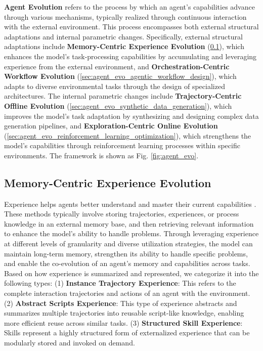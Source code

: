 \textbf{Agent Evolution} refers to the process by which an agent’s capabilities advance through various mechanisms, typically realized through continuous interaction with the external environment. This process encompasses both external structural adaptations and internal parametric changes. Specifically, external structural adaptations include \textbf{Memory-Centric Experience Evolution} (\cref{sec:agent_evo_experience_utilization}), which enhances the model's task-processing capabilities by accumulating and leveraging experience from the external environment, and \textbf{Orchestration-Centric Workflow Evolution} (\cref{sec:agent_evo_agentic_workflow_design}), which adapts to diverse environmental tasks through the design of specialized architectures. The internal parametric changes include \textbf{Trajectory-Centric Offline Evolution} (\cref{sec:agent_evo_synthetic_data_generation}), which improves the model’s task adaptation by synthesizing and designing complex data generation pipelines, and \textbf{Exploration-Centric Online Evolution} (\cref{sec:agent_evo_reinforcement_learning_optimization}), which strengthens the model's capabilities through reinforcement learning processes within specific environments. The framework is shown as Fig. \ref{fig:agent_evo}.

\subsection{Memory-Centric Experience Evolution}
\label{sec:agent_evo_experience_utilization}
Experience helps agents better understand and master their current capabilities \cite{survey_Memory_in, survey_Rethinking_Memory_in, survey_Rethinking_Memory,Think_While_Watching,Learning_How_to_Remember}. These methods typically involve storing trajectories, experiences, or process knowledge in an external memory base, and then retrieving relevant information to enhance the model’s ability to handle problems. Through leveraging experience at different levels of granularity and diverse utilization strategies, the model can maintain long-term memory, strengthen its ability to handle specific problems, and enable the co-evolution of an agent’s memory and capabilities across tasks. Based on how experience is summarized and represented, we categorize it into the following types: (1) \textbf{Instance Trajectory Experience}: This refers to the complete interaction trajectories and actions of an agent with the environment. (2) \textbf{Abstract Scripts Experience}: This type of experience abstracts and summarizes multiple trajectories into reusable script-like knowledge, enabling more efficient reuse across similar tasks. (3) \textbf{Structured Skill Experience}: Skills represent a highly structured form of externalized experience that can be modularly stored and invoked on demand.




